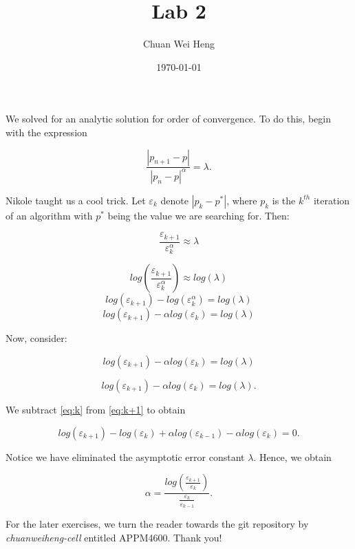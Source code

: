 \documentclass[12pt]{article}
\title{Lab 2}
\author{Chuan Wei Heng}
\date{\today}
\begin{document}
\maketitle

We solved for an analytic solution for order of convergence.
To do this, begin with the expression

\begin{equation}
    \frac{|p_{n+1}-p|}{|p_n-p|^\alpha}=\lambda.
\end{equation}

Nikole taught us a cool trick. Let $\varepsilon_k$ denote $
|p_k-p^*|$, where $p_k$ is the $k^{th}$ iteration of an 
algorithm with $p^*$ being the value we are searching for. 
Then:

\[
\frac{\varepsilon_{k+1}}{\varepsilon_k^\alpha}\approx\lambda
\]

\[
log(\frac{\varepsilon_{k+1}}{\varepsilon_k^\alpha})\approx log(\lambda)
\]
\[
log(\varepsilon_{k+1})-log(\varepsilon_k^\alpha)=log(\lambda)
\]
\[
log(\varepsilon_{k+1})-\alpha log(\varepsilon_k)=log(\lambda)
\]

Now, consider:

\begin{equation}
    log(\varepsilon_{k+1})-\alpha log(\varepsilon_k)=log(\lambda)
    \label{eq:k+1}
\end{equation}

\begin{equation}
    log(\varepsilon_{k+1})-\alpha log(\varepsilon_k)=log(\lambda)
    \label{eq:k}.
\end{equation}

We subtract \ref{eq:k} from \ref{eq:k+1} to obtain

\[
    log(\varepsilon_{k+1})-log(\varepsilon_k)+\alpha log(
        \varepsilon_{k-1})-\alpha log(\varepsilon_k)=0.
\]

Notice we have eliminated the asymptotic error constant 
$\lambda$. Hence, we obtain

\begin{equation}
    \alpha=\frac{log(\frac{\varepsilon_{k+1}}{\varepsilon_k})}
    {\frac{\varepsilon_k}{\varepsilon_{k-1}}}.
\end{equation}

For the later exercises, we turn the reader towards the git 
repository by \textit{chuanweiheng-cell} entitled APPM4600.
Thank you!
\end{document}
